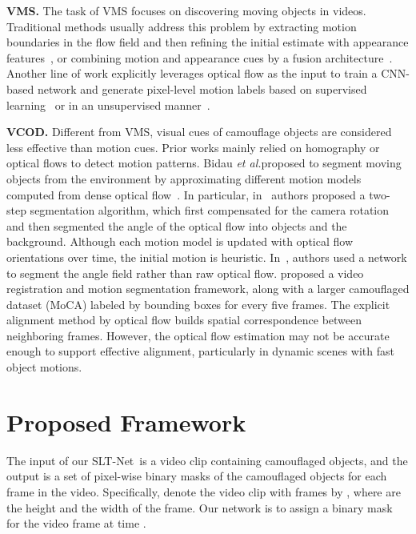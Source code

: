 \documentclass[10pt,twocolumn,letterpaper]{article}
\def\etal{\emph{et al.}}
\def\Ourmodel{SLT-Net}
\begin{document}
\noindent\textbf{VMS.}
The task of VMS focuses on discovering moving objects in videos. Traditional methods usually address this problem by extracting motion boundaries in the flow field and then refining the initial estimate with appearance features~\cite{papazoglou2013fast}, or combining motion and appearance cues by a fusion architecture~\cite{jain2017fusionseg}. Another line of work explicitly leverages optical flow as the input to train a CNN-based network and generate pixel-level motion labels based on supervised learning~\cite{tokmakov2017learning} or in an unsupervised manner~\cite{yang2021selfsupervised}. 

\noindent\textbf{VCOD.}
Different from VMS, visual cues of camouflage objects are considered less effective than motion cues. Prior works mainly relied on homography or optical flows to detect motion patterns. Bidau \etal proposed to segment moving objects from the environment by approximating different motion models computed from dense optical flow~\cite{bideau2016s, bideau2018moa}. In particular, in~\cite{bideau2016s} authors proposed a two-step segmentation algorithm, which first compensated for the camera rotation and then segmented the angle of the optical flow into objects and the background. Although each motion model is updated with optical flow orientations over time, the initial motion is heuristic. In~\cite{bideau2018moa}, authors used a  network to segment the angle field rather than raw optical flow. \cite{lamdouar2020betrayed} proposed a video registration and motion segmentation framework, along with a larger camouflaged dataset (MoCA) labeled by bounding boxes for every five frames. The explicit alignment method by optical flow builds spatial correspondence between neighboring frames. However, the optical flow estimation may not be accurate enough to support effective alignment, particularly in dynamic scenes with fast object motions.

\section{Proposed Framework}\label{sec:method}
The input of our \Ourmodel~is a video clip containing camouflaged objects, and the output is a set of pixel-wise binary masks of the camouflaged objects for each frame in the video. Specifically, denote the video clip with  frames by , where  are the height and the width of the frame. Our network is to assign a binary mask  for the video frame  at time . 
\end{document}
